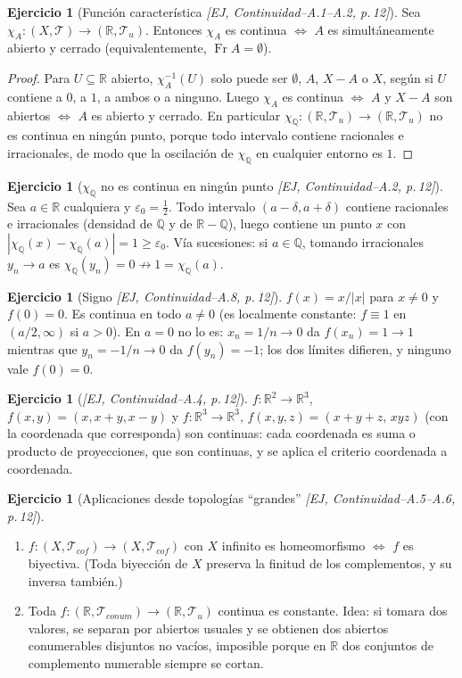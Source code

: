 \documentclass[11pt,a4paper]{article}
\theoremstyle{definition}
\newtheorem{ejercicio}[definicion]{Ejercicio}
\theoremstyle{plain}
\newcommand{\fnt}[1]{{\normalfont\small\itshape\color{gray!150!black}[#1]}}
\newcommand{\R}{\mathbb{R}}
\newcommand{\Q}{\mathbb{Q}}
\newcommand{\fr}{\operatorname{Fr}}
\newcommand{\tp}{\mathcal{T}}
\begin{document}
\begin{ejercicio}[Función característica \fnt{EJ, Continuidad--A.1--A.2, p.\,12}]
Sea $\chi_A:(X,\tp)\to(\R,\tp_u)$. Entonces $\chi_A$ es continua $\iff$ $A$ es simultáneamente abierto y cerrado (equivalentemente, $\fr A=\emptyset$).
\end{ejercicio}

\begin{proof}
Para $U\subseteq\R$ abierto, $\chi_A^{-1}(U)$ solo puede ser $\emptyset$, $A$, $X-A$ o $X$, según si $U$ contiene a $0$, a $1$, a ambos o a ninguno. Luego $\chi_A$ es continua $\iff$ $A$ y $X-A$ son abiertos $\iff$ $A$ es abierto y cerrado. En particular $\chi_\Q:(\R,\tp_u)\to(\R,\tp_u)$ no es continua en ningún punto, porque todo intervalo contiene racionales e irracionales, de modo que la oscilación de $\chi_\Q$ en cualquier entorno es $1$.
\end{proof}

\begin{ejercicio}[$\chi_\Q$ no es continua en ningún punto \fnt{EJ, Continuidad--A.2, p.\,12}]
Sea $a\in\R$ cualquiera y $\varepsilon_0=\tfrac12$. Todo intervalo $(a-\delta,a+\delta)$ contiene racionales e irracionales (densidad de $\Q$ y de $\R-\Q$), luego contiene un punto $x$ con $|\chi_\Q(x)-\chi_\Q(a)|=1\ge\varepsilon_0$. Vía sucesiones: si $a\in\Q$, tomando irracionales $y_n\to a$ es $\chi_\Q(y_n)=0\not\to 1=\chi_\Q(a)$.
\end{ejercicio}

\begin{ejercicio}[Signo \fnt{EJ, Continuidad--A.8, p.\,12}]
$f(x)=x/|x|$ para $x\ne0$ y $f(0)=0$. Es continua en todo $a\ne 0$ (es localmente constante: $f\equiv 1$ en $(a/2,\infty)$ si $a>0$). En $a=0$ no lo es: $x_n=1/n\to0$ da $f(x_n)=1\to 1$ mientras que $y_n=-1/n\to0$ da $f(y_n)=-1$; los dos límites difieren, y ninguno vale $f(0)=0$.
\end{ejercicio}

\begin{ejercicio}[\fnt{EJ, Continuidad--A.4, p.\,12}]
$f:\R^2\to\R^3$, $f(x,y)=(x,x+y,x-y)$ y $f:\R^3\to\R^3$, $f(x,y,z)=(x+y+z,\,xyz)$ (con la coordenada que corresponda) son continuas: cada coordenada es suma o producto de proyecciones, que son continuas, y se aplica el criterio coordenada a coordenada.
\end{ejercicio}

\begin{ejercicio}[Aplicaciones desde topologías ``grandes'' \fnt{EJ, Continuidad--A.5--A.6, p.\,12}]
\begin{enumerate}[label=(\alph*),leftmargin=2.2em,itemsep=0pt]
\item $f:(X,\tp_{cof})\to(X,\tp_{cof})$ con $X$ infinito es homeomorfismo $\iff$ $f$ es biyectiva. (Toda biyección de $X$ preserva la finitud de los complementos, y su inversa también.)
\item Toda $f:(\R,\tp_{conum})\to(\R,\tp_u)$ continua es constante. Idea: si tomara dos valores, se separan por abiertos usuales y se obtienen dos abiertos conumerables disjuntos no vacíos, imposible porque en $\R$ dos conjuntos de complemento numerable siempre se cortan.
\end{enumerate}
\end{ejercicio}
\end{document}

